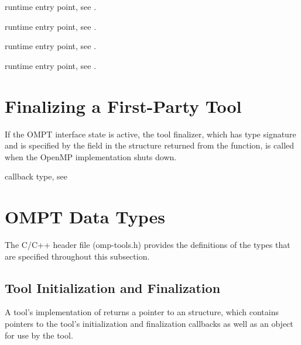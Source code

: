 \begin{crossrefs}
\item {} runtime entry point, see .

\item {} runtime entry point, see .

\item {} runtime entry point, 
see .

\item {} runtime entry point, 
see .
\end{crossrefs}


\section{Finalizing a First-Party Tool}
\label{sec:ompt-finalization}

If the OMPT interface state is active, the tool finalizer, which has type 
signature  and is specified by the  field 
in the  structure returned from the 
 function, is called when the OpenMP implementation 
shuts down.

\begin{crossrefs}
\item {} callback type, see 
\end{crossrefs}



\section{OMPT Data Types}
\label{sec:ompt-data-types}

The C/C++ header file (omp-tools.h) provides the definitions of the 
types that are specified throughout this subsection.

\subsection{Tool Initialization and Finalization}
\label{sec:ompt_start_tool_result_t}

\summary
A tool's implementation of  returns a pointer to an
 structure, which contains pointers to the 
tool's initialization and finalization callbacks as well as an 
 object for use by the tool.

